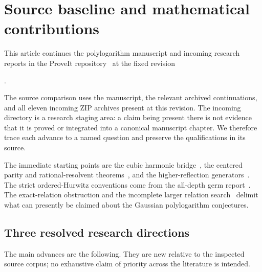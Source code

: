 \section{Source baseline and mathematical contributions}
\label{intro:scope}

This article continues the polylogarithm manuscript and incoming
research reports in the ProveIt repository~\cite{ProveIt} at the fixed
revision
\begin{center}\snapshot.\end{center}
The source comparison uses the manuscript, the relevant archived
continuations, and all eleven incoming ZIP archives present at this
revision. The incoming directory is a research staging area: a claim
being present there is not evidence that it is proved or integrated
into a canonical manuscript chapter. We therefore trace each advance
to a named question and preserve the qualifications in its source.

The immediate starting points are the cubic harmonic
bridge~\cite{IncomingCubic}, the centered parity and rational-resolvent
theorems~\cite{IncomingParity}, and the higher-reflection
generators~\cite{IncomingReflection}. The strict ordered-Hurwitz
conventions come from the all-depth germ report~\cite{IncomingOrdered}.
The exact-relation obstruction and the incomplete larger relation
search~\cite{IncomingExact,IncomingIndependent} delimit what can
presently be claimed about the Gaussian polylogarithm conjectures.

\subsection{Three resolved research directions}

The main advances are the following. They are new relative to the
inspected source corpus; no exhaustive claim of priority across the
literature is intended.

